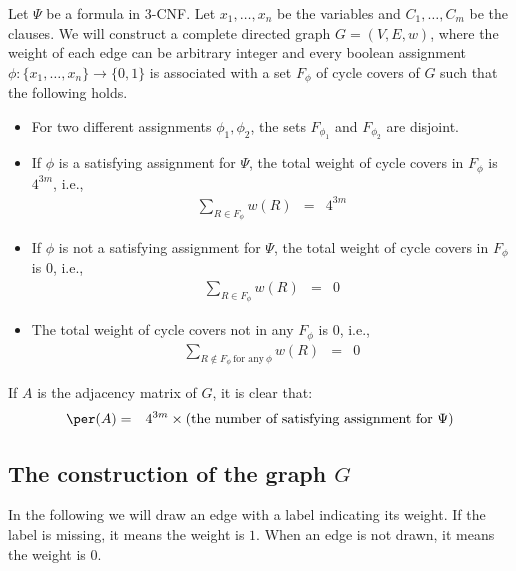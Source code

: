 \documentclass[11pt, a4paper]{article}
\begin{document}
Let $\Psi$ be a formula in 3-CNF. 
Let $x_1,\ldots,x_n$ be the variables and $C_1,\ldots,C_m$ be the clauses.
We will construct a complete directed graph $G=(V,E,w)$, where the weight of each edge can be arbitrary integer
and every boolean assignment $\phi:\{x_1,\ldots,x_n\}\to\{0,1\}$ is associated with a set $F_{\phi}$ of cycle covers of $G$
such that the following holds.
\begin{itemize}
\item
For two different assignments $\phi_1,\phi_2$, the sets $F_{\phi_1}$ and $F_{\phi_2}$ are disjoint.
\item
If $\phi$ is a satisfying assignment for $\Psi$, the total weight of cycle covers in $F_{\phi}$ is $4^{3m}$, i.e.,
\begin{eqnarray*}
\sum_{R\in F_{\phi}} w(R) & = & 4^{3m}
\end{eqnarray*}
\item
If $\phi$ is not a satisfying assignment for $\Psi$, the total weight of cycle covers in $F_{\phi}$ is $0$,
i.e.,
\begin{eqnarray*}
\sum_{R\in F_{\phi}} w(R) & = & 0
\end{eqnarray*}
\item
The total weight of cycle covers not in any $F_{\phi}$ is $0$, i.e.,
\begin{eqnarray*}
\sum_{R\notin F_{\phi}\ \text{for any}\ \phi} w(R) & = & 0
\end{eqnarray*}
\end{itemize}
If $A$ is the adjacency matrix of $G$, it is clear that:
\begin{eqnarray*}
\per(A) & = & 4^{3m}\times(\text{the number of satisfying assignment for}\ \Psi)
\end{eqnarray*}

\subsection{The construction of the graph $G$}

In the following we will draw an edge with a label indicating its weight.
If the label is missing, it means the weight is $1$.
When an edge is not drawn, it means the weight is $0$.
\end{document}

